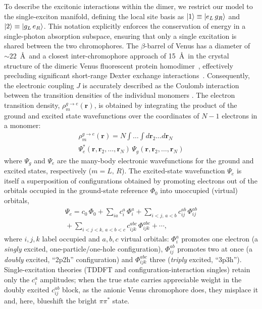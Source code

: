 \documentclass[journal=jpcbfk, manuscript=article, layout=twocolumn, doi=true]{achemso}
\begin{document}
To describe the excitonic interactions within the dimer, we restrict our model to the single-exciton manifold, defining the local site basis as $\ket{1}\equiv\ket{e_L \, g_R}$ and $\ket{2}\equiv\ket{g_L \, e_R}$. This notation explicitly enforces the conservation of energy in a single-photon absorption subspace, ensuring that only a single excitation is shared between the two chromophores. The $\beta$-barrel of Venus has a diameter of $\sim 22$~\AA\ and a closest inter-chromophore approach of 15~\AA\ in the crystal structure of the dimeric Venus fluorescent protein homodimer~\cite{kim2019venusa206}, effectively precluding significant short-range Dexter exchange interactions~\cite{skourtis2016dexter}. Consequently, the electronic coupling $J$ is accurately described as the Coulomb interaction between the transition densities of the individual monomers \cite{hsu2009}. The electron transition density, $\rho^{g\to e}_m(\mathbf r)$, is obtained by integrating the product of the ground and excited state wavefunctions over the coordinates of $N-1$ electrons in a monomer:
\begin{multline} \label{eq:transition_density}
    \rho^{g\to e}_m(\mathbf{r}) =  
    N \int \dots \int d\mathbf{r}_2 \dots d\mathbf{r}_N \\ \Psi_e^*(\mathbf{r}, \mathbf{r}_2, \dots, \mathbf{r}_N) \, \Psi_g(\mathbf{r}, \mathbf{r}_2, \dots, \mathbf{r}_N)
\end{multline}
where $\Psi_g$ and $\Psi_e$ are the many-body electronic wavefunctions for the ground and excited states, respectively ($m=L,\,R$). 
The excited-state wavefunction $\Psi_e$ is itself a superposition of configurations obtained by promoting electrons out of the orbitals occupied in the ground-state reference $\Phi_0$ into unoccupied (virtual) orbitals,
\begin{multline} \label{eq:ci_expansion}
    \Psi_e = c_0\,\Phi_0 + \sum_{ia} c_i^{a}\,\Phi_i^{a}
    + \sum_{i<j,\,a<b} c_{ij}^{ab}\,\Phi_{ij}^{ab} \\
    {}+ \sum_{i<j<k,\,a<b<c} c_{ijk}^{abc}\,\Phi_{ijk}^{abc} + \cdots,
\end{multline}
where $i,j,k$ label occupied and $a,b,c$ virtual orbitals: $\Phi_i^{a}$ promotes one electron (a \emph{singly} excited, one-particle/one-hole configuration), $\Phi_{ij}^{ab}$ promotes two at once (a \emph{doubly} excited, ``2p2h'' configuration) and $\Phi_{ijk}^{abc}$ three (\emph{triply} excited, ``3p3h''). Single-excitation theories (TDDFT and configuration-interaction singles) retain only the $c_i^{a}$ amplitudes; when the true state carries appreciable weight in the doubly excited $c_{ij}^{ab}$ block, as the anionic Venus chromophore does, they misplace it and, here, blueshift the bright $\pi\pi^{*}$ state.
\end{document}
